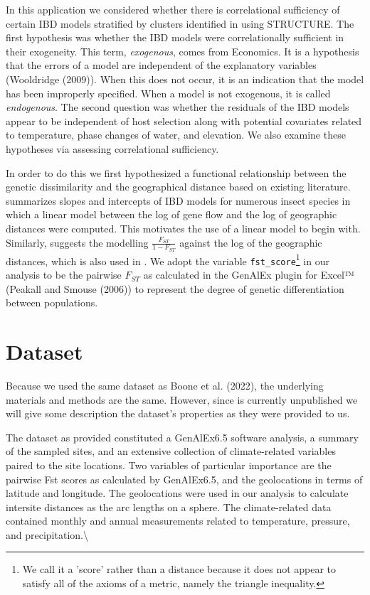 \documentclass[
  letterpaper,
  DIV=11,
  numbers=noendperiod]{scrreprt}
\begin{document}
In this application we considered whether there is correlational
sufficiency of certain IBD models stratified by clusters identified in
\cite{booneunpublished} using STRUCTURE. The first hypothesis was
whether the IBD models were correlationally sufficient in their
exogeneity. This term, \textit{exogenous}, comes from Economics. It is a
hypothesis that the errors of a model are independent of the explanatory
variables (Wooldridge (2009)). When this does not occur, it is an
indication that the model has been improperly specified. When a model is
not exogenous, it is called \textit{endogenous}. The second question was
whether the residuals of the IBD models appear to be independent of host
selection along with potential covariates related to temperature, phase
changes of water, and elevation. We also examine these hypotheses via
assessing correlational sufficiency.

In order to do this we first hypothesized a functional relationship
between the genetic dissimilarity and the geographical distance based on
existing literature. \cite{Peterson1998} summarizes slopes and
intercepts of IBD models for numerous insect species in which a linear
model between the log of gene flow and the log of geographic distances
were computed. This motivates the use of a linear model to begin with.
Similarly, \cite{Rousset1997} suggests the modelling
\(\frac{F_{ST}}{1- F_{ST}}\) against the log of the geographic
distances, which is also used in \cite{booneunpublished}. We adopt the
variable
\texttt{fst\_score}\footnote{We call it a 'score' rather than a distance because it does not appear to satisfy all of the axioms of a metric, namely the triangle inequality.}
in our analysis to be the pairwise \(F_{ST}\) as calculated in the
GenAlEx plugin for Excel™ (Peakall and Smouse (2006)) to represent the
degree of genetic differentiation between populations.

\section{Dataset}\label{dataset}

Because we used the same dataset as Boone et al. (2022), the underlying
materials and methods are the same. However, since
\cite{booneunpublished} is currently unpublished we will give some
description the dataset's properties as they were provided to us.

The dataset as provided constituted a GenAlEx6.5 software analysis, a
summary of the sampled sites, and an extensive collection of
climate-related variables paired to the site locations. Two variables of
particular importance are the pairwise Fst scores as calculated by
GenAlEx6.5, and the geolocations in terms of latitude and longitude. The
geolocations were used in our analysis to calculate intersite distances
as the arc lengths on a sphere. The climate-related data contained
monthly and annual measurements related to temperature, pressure, and
precipitation.\textbackslash{}
\end{document}
